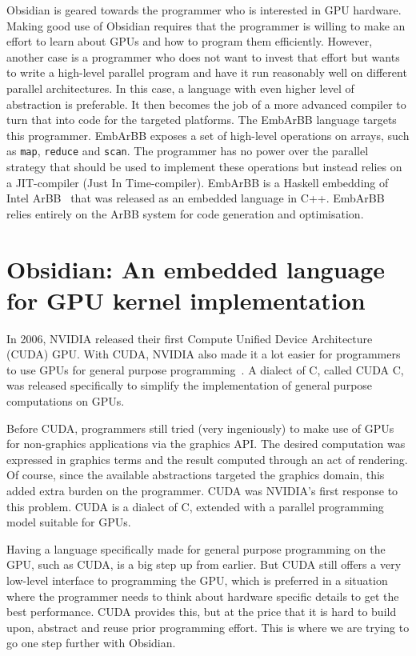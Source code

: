 \documentclass[a4paper]{book}
\begin{document}
Obsidian is geared towards the programmer who is interested in GPU hardware. Making 
good use of Obsidian requires that the programmer is willing to make an effort 
to learn about GPUs and how to program them efficiently. However, another case 
is a programmer who does not want to invest that effort but wants to write a high-level 
parallel program and have it run reasonably well on different parallel architectures. 
In this case, a language with even higher level of abstraction is preferable. It then 
becomes the job of a more advanced compiler to turn that into code for the targeted 
platforms. The EmbArBB language targets this programmer. EmbArBB exposes a set of high-level 
operations on arrays, such as {\tt map}, {\tt reduce} and {\tt scan}. The programmer 
has no power over the parallel strategy that should be used to implement these 
operations but instead relies on a JIT-compiler (Just In Time-compiler). EmbArBB is a 
Haskell embedding of Intel ArBB~\citet{ARBB2011} that was released as an embedded language 
in C++. EmbArBB relies entirely on the ArBB system for code generation and optimisation.  


\section {Obsidian: An embedded language for GPU kernel implementation} 

In 2006, NVIDIA released their first Compute Unified Device Architecture (CUDA) 
GPU. With CUDA, NVIDIA also made it a lot easier for programmers to use GPUs
for general purpose programming~\citet{wwwcuda}. A dialect of C, called CUDA C, was released 
specifically to simplify the implementation of general purpose computations on GPUs. 

Before CUDA, programmers still tried (very ingeniously) to make use of GPUs for 
non-graphics applications via the graphics API. The desired computation was expressed 
in graphics terms and the result computed through an act of rendering. Of course, since the 
available abstractions targeted the graphics domain, this added extra
burden on the programmer. CUDA was NVIDIA's first response to this problem. CUDA 
is a dialect of C, extended with a parallel programming model suitable for GPUs. 

Having a language specifically made for general purpose programming on the GPU, such as 
CUDA, is a big step up from earlier. But CUDA still offers a very low-level interface to 
programming the GPU, which is preferred in a situation where the programmer needs to 
think about hardware specific details to get the best performance. CUDA provides this, 
but at the price that it is hard to build upon, abstract and reuse prior programming 
effort. This is where we are trying to go one step further with Obsidian. 
\end{document}
